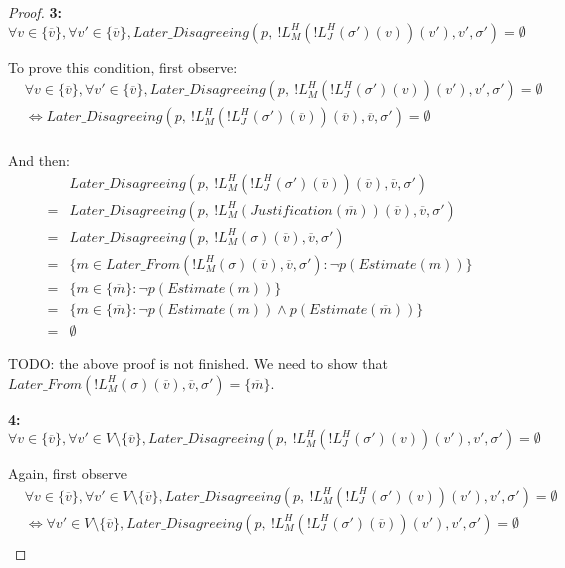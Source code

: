 \begin{proof}
\textbf{3:} $\forall v \in \{\overline{v}\}, \forall v' \in \{\overline{v}\}, Later\_Disagreeing(p,~!L^H_M(!L^H_J(\sigma')(v))(v'), v', \sigma') = \emptyset$


To prove this condition, first observe:
\begin{align}
&\forall v \in \{\overline{v}\}, \forall v' \in \{\overline{v}\}, Later\_Disagreeing(p,~!L^H_M(!L^H_J(\sigma')(v))(v'), v', \sigma') = \emptyset \\
&\iff Later\_Disagreeing(p,~!L^H_M(!L^H_J(\sigma')(\overline{v}))(\overline{v}), \overline{v}, \sigma') = \emptyset \\
\end{align}

And then:
\begin{align}
 &Later\_Disagreeing(p,~!L^H_M(!L^H_J(\sigma')(\overline{v}))(\overline{v}), \overline{v}, \sigma') \\
=&Later\_Disagreeing(p,~!L^H_M(Justification(\overline{m}))(\overline{v}), \overline{v}, \sigma') \\
=& Later\_Disagreeing(p,~!L^H_M(\sigma)(\overline{v}), \overline{v}, \sigma') \\
=& \{ m \in Later\_From(!L^H_M(\sigma)(\overline{v}), \overline{v}, \sigma') : \neg p(Estimate(m)) \}\\
=& \{ m \in \{\overline{m}\} : \neg p(Estimate(m)) \}\\
=& \{ m \in \{\overline{m}\} : \neg p(Estimate(m)) \land p(Estimate(\overline{m})) \} \\
=& \emptyset
\end{align}

TODO: the above proof is not finished. We need to show that $Later\_From(!L^H_M(\sigma)(\overline{v}), \overline{v}, \sigma') = \{\overline{m}\}$.


\textbf{4:} $\forall v \in \{\overline{v}\}, \forall v' \in V \setminus \{\overline{v}\}, Later\_Disagreeing(p,~!L^H_M(!L^H_J(\sigma')(v))(v'), v', \sigma') = \emptyset$


Again, first observe
\begin{align}
&\forall v \in \{\overline{v}\}, \forall v' \in V \setminus \{\overline{v}\}, Later\_Disagreeing(p,~!L^H_M(!L^H_J(\sigma')(v))(v'), v', \sigma') = \emptyset \\
&\iff \forall v' \in V \setminus \{\overline{v}\}, Later\_Disagreeing(p,~!L^H_M(!L^H_J(\sigma')(\overline{v}))(v'), v', \sigma') = \emptyset \\
\end{align}


\end{proof}
